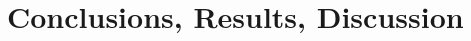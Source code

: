 \documentclass[]{rptuseminar}
\begin{document}
\section{Conclusions, Results, Discussion}
\label{sec:conclusions}

\newpage
\nocite{*}



\end{document}
